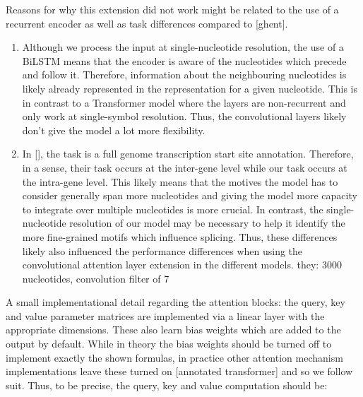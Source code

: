 Reasons for why this extension did not work might be related to the use of a recurrent encoder as well as task differences compared to [ghent].
\begin{enumerate}
	\item Although we process the input at single-nucleotide resolution, the use of a BiLSTM means that the encoder is aware of the nucleotides which precede and follow it. Therefore, information about the neighbouring nucleotides is likely already represented in the representation for a given nucleotide. This is in contrast to a Transformer model where the layers are non-recurrent and only work at single-symbol resolution. Thus, the convolutional layers likely don't give the model a lot more flexibility.
	\item In [], the task is a full genome transcription start site annotation. Therefore, in a sense, their task occurs at the inter-gene level while our task occurs at the intra-gene level. This likely means that the motives the model has to consider generally span more nucleotides and giving the model more capacity to integrate over multiple nucleotides is more crucial. In contrast, the single-nucleotide resolution of our model may be necessary to help it identify the more fine-grained motifs which influence splicing. Thus, these differences likely also influenced the performance differences when using the convolutional attention layer extension in the different models.
		they: 3000 nucleotides, convolution filter of 7
\end{enumerate}


A small implementational detail regarding the attention blocks: the query, key and value parameter matrices are implemented via a linear layer with the appropriate dimensions. These also learn bias weights which are added to the output by default. While in theory the bias weights should be turned off to implement exactly the shown formulas, in practice other attention mechanism implementations leave these turned on [annotated transformer] and so we follow suit. Thus, to be precise, the query, key and value computation should be:

